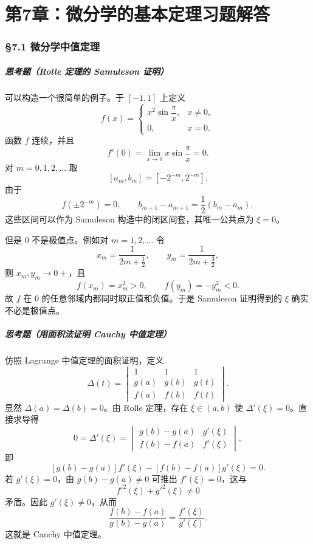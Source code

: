 
\chapter*{第7章：微分学的基本定理习题解答}
\subsection*{§7.1 微分学中值定理}

\paragraph{思考题（Rolle 定理的 Samuleson 证明）}
\begin{xsolution}
可以构造一个很简单的例子。于 $[-1,1]$ 上定义
\[
  f(x)=
  \begin{cases}
    x^2\sin\dfrac{\pi}{x},&x\neq0,\\
    0,&x=0.
  \end{cases}
\]
函数 $f$ 连续，并且
\[
  f'(0)=\lim_{x\to0}x\sin\frac{\pi}{x}=0.
\]
对 $m=0,1,2,\ldots$ 取
\[
  [a_m,b_m]=[-2^{-m},2^{-m}].
\]
由于
\[
  f(\pm2^{-m})=0,
  \qquad
  b_{m+1}-a_{m+1}=\frac12(b_m-a_m),
\]
这些区间可以作为 Samuleson 构造中的闭区间套，其唯一公共点为 $\xi=0$。

但是 $0$ 不是极值点。例如对 $m=1,2,\ldots$ 令
\[
  x_m=\frac{1}{2m+\frac12},
  \qquad
  y_m=\frac{1}{2m+\frac32},
\]
则 $x_m,y_m\to0+$，且
\[
  f(x_m)=x_m^2>0,
  \qquad
  f(y_m)=-y_m^2<0.
\]
故 $f$ 在 $0$ 的任意邻域内都同时取正值和负值。于是 Samuleson 证明得到的 $\xi$ 确实不必是极值点。
\end{xsolution}

\paragraph{思考题（用面积法证明 Cauchy 中值定理）}
\begin{xsolution}
仿照 Lagrange 中值定理的面积证明，定义
\[
  \Delta(t)=
  \begin{vmatrix}
    1&1&1\\
    g(a)&g(b)&g(t)\\
    f(a)&f(b)&f(t)
  \end{vmatrix}.
\]
显然 $\Delta(a)=\Delta(b)=0$。由 Rolle 定理，存在 $\xi\in(a,b)$ 使 $\Delta'(\xi)=0$。直接求导得
\[
  0=\Delta'(\xi)
  =
  \begin{vmatrix}
    g(b)-g(a)&g'(\xi)\\
    f(b)-f(a)&f'(\xi)
  \end{vmatrix},
\]
即
\[
  [g(b)-g(a)]f'(\xi)-[f(b)-f(a)]g'(\xi)=0.
\]
若 $g'(\xi)=0$，由 $g(b)-g(a)\neq0$ 可推出 $f'(\xi)=0$，这与
\[
  f'^2(\xi)+g'^2(\xi)\neq0
\]
矛盾。因此 $g'(\xi)\neq0$，从而
\[
  \frac{f(b)-f(a)}{g(b)-g(a)}
  =\frac{f'(\xi)}{g'(\xi)}.
\]
这就是 Cauchy 中值定理。
\end{xsolution}

